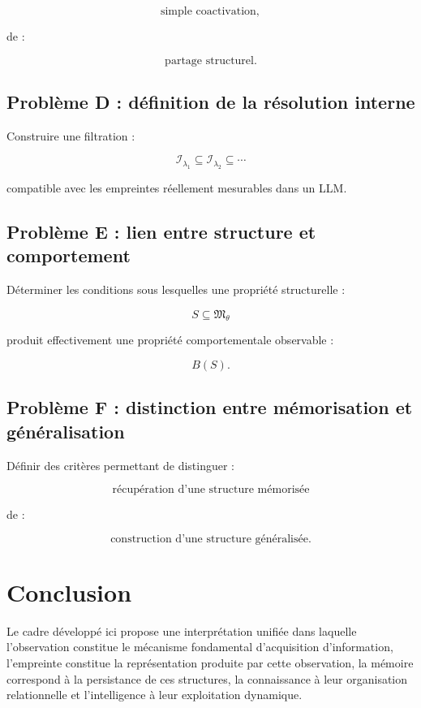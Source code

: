 \documentclass[11pt,a4paper]{article}
\begin{document}
\[
\text{simple coactivation},
\]

de :

\[
\text{partage structurel}.
\]

\subsection{Problème D : définition de la résolution interne}

Construire une filtration :

\[
\mathcal I_{\lambda_1}
\subseteq
\mathcal I_{\lambda_2}
\subseteq
\cdots
\]

compatible avec les empreintes réellement mesurables dans un LLM.

\subsection{Problème E : lien entre structure et comportement}

Déterminer les conditions sous lesquelles une propriété structurelle :

\[
S\subseteq\mathfrak M_\theta
\]

produit effectivement une propriété comportementale observable :

\[
B(S).
\]

\subsection{Problème F : distinction entre mémorisation et généralisation}

Définir des critères permettant de distinguer :

\[
\text{récupération d'une structure mémorisée}
\]

de :

\[
\text{construction d'une structure généralisée}.
\]

\section{Conclusion}

Le cadre développé ici propose une interprétation unifiée dans laquelle
l'observation constitue le mécanisme fondamental d'acquisition
d'information, l'empreinte constitue la représentation produite par cette
observation, la mémoire correspond à la persistance de ces structures, la
connaissance à leur organisation relationnelle et l'intelligence à leur
exploitation dynamique.
\end{document}

